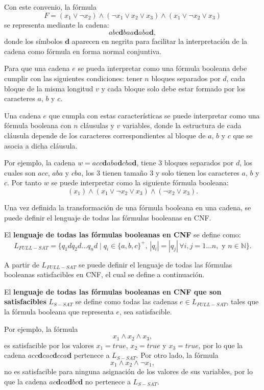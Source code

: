 Con este convenio, la fórmula
$$ F=(x_1 \vee \neg x_2) \wedge (\neg x_1 \vee x_2 \vee x_3) \wedge (x_1 \vee \neg x_2 \vee x_3)$$
se representa mediante la cadena:
$$abc\mathbf{d}baa\mathbf{d}aba\mathbf{d},$$
donde los símbolos $\mathbf{d}$ aparecen en negrita para facilitar la interpretación de la cadena como fórmula 
en forma normal conjuntiva.

Para que una cadena $e$ se pueda interpretar como una fórmula booleana debe cumplir con las siguientes condiciones:
tener $n$ bloques separados por $d$, cada bloque de la misma longitud $v$ y cada bloque solo debe estar formado por los caracteres
$a$, $b$ y $c$. 

Una cadena $e$ que cumpla con estas características  se puede interpretar como una fórmula booleana con $n$ cláusulas y $v$ variables, donde la estructura de cada cláusula depende de los caracteres correspondientes al bloque de $a$, $b$ y $c$ que se asocia a dicha cláusula.

Por ejemplo, la cadena $w=acc\mathbf{d}aba\mathbf{d}cba\mathbf{d}$, tiene 3 bloques separados por $d$, los cuales son $acc$, $aba$ y $cba$, los 3 tienen tamaño 3 y solo tienen los caracteres $a$, $b$ y $c$.
Por tanto  $w$ se puede interpretar como la siguiente fórmula booleana:
$$(x_1)\wedge(x_1\vee \neg x_2 \vee x_3) \wedge (\neg x_2\vee x_3).$$

Una vez definida la transformación de una fórmula booleana en una cadena, se puede definir el lenguaje de todas las fórmulas booleanas en CNF.

\begin{definition}
    El \textbf{lenguaje de todas las fórmulas booleanas en CNF} se define como:
    \[
        L_{FULL-SAT} = \{ q_1dq_2d\dots q_nd \mid q_i \in \{a, b,c\}^+\text{, }
        |q_i| = |q_j| \, \forall i, j =1\dots n, \text{ y } n\in \mathbb{N}\}.
    \]
\end{definition}

A partir de $L_{FULL-SAT}$ se puede definir el lenguaje de todas las fórmulas booleanas satisfacibles
en CNF, el cual se define a continuación.

\begin{definition}
    El \textbf{lenguaje de todas las fórmulas booleanas en CNF que son satisfacibles} $L_{S-SAT}$ se define como todas las cadenas $e\in L_{FULL-SAT}$,
    tales que la fórmula booleana que representa $e$, sea satisfacible.
\end{definition}

Por ejemplo, la fórmula $$x_1\wedge x_2 \wedge x_3,$$ es satisfacible por los valores $x_1=true$, $x_2=true$ y $x_3=true$, por lo que la 
cadena $acc\mathbf{d}cac\mathbf{d}cca\mathbf{d}$ pertenece a $L_{S-SAT}$. Por otro lado, la fórmula $$x_1\wedge x_2 \wedge \neg x_1,$$
no es satisfacible para ninguna asignación de los valores de sus variables, por lo que la cadena $ac\mathbf{d}ca\mathbf{d}bc\mathbf{d}$
no pertenece a $L_{S-SAT}$.

